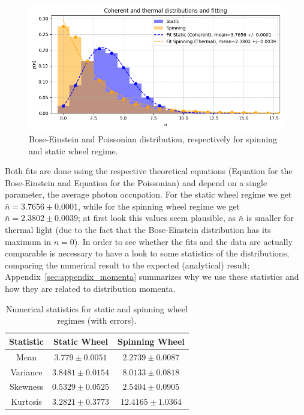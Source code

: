 \documentclass[prl,twocolumn]{revtex4-1}
\begin{document}
\begin{figure}[!b]
    \centering
    \includegraphics[width=\linewidth]{Images/distr_fit.png}
    \caption{Bose-Einstein and Poissonian distribution, respectively for spinning and static wheel regime.}
    \label{fig:distr_fit}
\end{figure}

Both fits are done using the respective theoretical equations (Equation for the Bose-Einstein and Equation for the Poissonian) and depend on a single parameter, the average photon occupation. For the static wheel regime we get $\bar{n} = 3.7656 \pm 0.0001$, while for the spinning wheel regime we get $\bar{n} = 2.3802 \pm 0.0039$; at first look this values seem plausible, as $\bar{n}$ is smaller for thermal light (due to the fact that the Bose-Einstein distribution has its maximum in $n = 0$). In order to see whether the fits and the data are actually comparable is necessary to have a look to some statistics of the distributions, comparing the numerical result to the expected (analytical) result; Appendix~\ref{sec:appendix_momenta} summarizes why we use these statistics and how they are related to distribution momenta. 

\begin{table}[htbp]
    \centering
    \begin{tabular}{|c||c||c|}
        \hline
        \textbf{Statistic} & \textbf{Static Wheel} & \textbf{Spinning Wheel} \\
        \hline
        \hline
        Mean               & $3.779 \pm 0.0051$                 & $2.2739 \pm 0.0087$                     \\ 
        \hline
        Variance           & $3.8481 \pm 0.0154$                & $8.0133 \pm 0.0818$                     \\ 
        \hline
        Skewness           & $0.5329 \pm 0.0525$                & $2.5404 \pm 0.0905$                     \\ 
        \hline
        Kurtosis           & $3.2821 \pm 0.3773$                & $12.4165 \pm 1.0364$                    \\ 
        \hline
    \end{tabular}
    \caption{Numerical statistics for static and spinning wheel regimes (with errors).}
    \label{tab:numerical}
\end{table}
\end{document}
